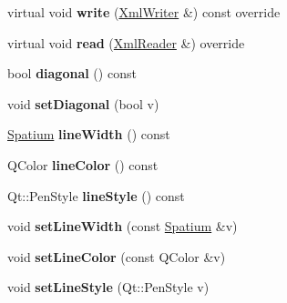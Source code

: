 \begin{DoxyCompactItemize}
\item 
\mbox{\label{class_ms_1_1_s_line_a823ada40b32a8e25471ff3282476465f}} 
virtual void {\bfseries write} (\hyperlink{class_ms_1_1_xml_writer}{Xml\+Writer} \&) const override
\item 
\mbox{\label{class_ms_1_1_s_line_ac1a7c38cf53a3109b76fa9b1deb6e13a}} 
virtual void {\bfseries read} (\hyperlink{class_ms_1_1_xml_reader}{Xml\+Reader} \&) override
\item 
\mbox{\label{class_ms_1_1_s_line_afb15c52d052cd4cf386948f7650807e6}} 
bool {\bfseries diagonal} () const
\item 
\mbox{\label{class_ms_1_1_s_line_a3607607e62c180dd7572aaa39872f88c}} 
void {\bfseries set\+Diagonal} (bool v)
\item 
\mbox{\label{class_ms_1_1_s_line_a73755d49b20614c74c35fde805257627}} 
\hyperlink{class_ms_1_1_spatium}{Spatium} {\bfseries line\+Width} () const
\item 
\mbox{\label{class_ms_1_1_s_line_a764fde085f95be1462302f8b3f85aa92}} 
Q\+Color {\bfseries line\+Color} () const
\item 
\mbox{\label{class_ms_1_1_s_line_a087bcfd18a68c434ef2d6a2d29649c69}} 
Qt\+::\+Pen\+Style {\bfseries line\+Style} () const
\item 
\mbox{\label{class_ms_1_1_s_line_af233f3e0c861ad79d6f39c61896d4032}} 
void {\bfseries set\+Line\+Width} (const \hyperlink{class_ms_1_1_spatium}{Spatium} \&v)
\item 
\mbox{\label{class_ms_1_1_s_line_a1b5eec9ff9c4d65629adfc2f57e2fcbb}} 
void {\bfseries set\+Line\+Color} (const Q\+Color \&v)
\item 
\mbox{\label{class_ms_1_1_s_line_a5f3bd6426e3423f18451ed3e6b349a61}} 
void {\bfseries set\+Line\+Style} (Qt\+::\+Pen\+Style v)
\item 
\mbox{\label{class_ms_1_1_s_line_a239012a68537ea21b67baceaffa3e012}} 

\end{DoxyCompactItemize}
